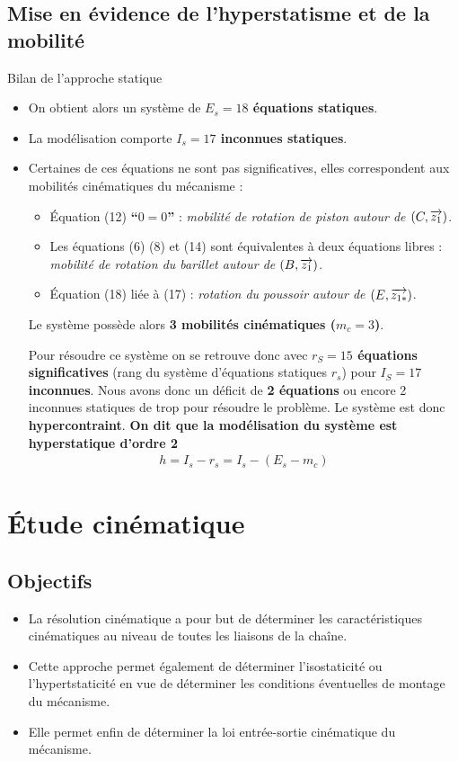 \documentclass[10pt,fleqn]{article} %
\begin{document}
\subsection{Mise en évidence de l'hyperstatisme et de la mobilité}
Bilan de l'approche statique
\begin{itemize}
\item On obtient alors un système de \textbf{$E_s=18$ équations statiques}.
\item La modélisation comporte \textbf{$I_s=17$ inconnues statiques}.
\item Certaines de ces équations ne sont pas significatives, elles correspondent aux mobilités cinématiques du mécanisme :
\begin{itemize}
\item Équation (12) \textbf{``$0=0$''} : \textit{mobilité de rotation de piston autour de $\left(C,\overrightarrow{{z_1}}\right)$}.
\item Les équations (6) (8) et (14) sont équivalentes à deux équations libres : \textit{mobilité de rotation du barillet autour de $\left(B,\overrightarrow{{z_1}}\right)$}.
\item Équation (18) liée à (17) : \textit{rotation du poussoir autour de $\left(E,\overrightarrow{{z_{1*}}}\right)$}.		
\end{itemize}
Le système possède alors \textbf{3 mobilités cinématiques ($m_c=3$)}.
		
		Pour résoudre ce système on se retrouve donc avec \textbf{$r_S=15$ équations significatives} (rang du système d'équations statiques $r_s$) pour \textbf{$I_S=17$ inconnues}. Nous avons donc un déficit de \textbf{2 équations} ou encore 2 inconnues statiques de trop pour résoudre le problème. Le système est donc \textbf{hypercontraint}.
		\textbf{On dit que la modélisation du système est hyperstatique d'ordre 2}
\begin{align}\label{hyper_statique}
\boxed{
h=I_s-r_s=I_s-(E_s-m_c)
}
\end{align}
		
\end{itemize}




\section{Étude cinématique}
\subsection{Objectifs}
\begin{itemize}
\item La résolution cinématique a pour but de déterminer les caractéristiques cinématiques au niveau de toutes les liaisons de la chaîne.
\item Cette approche permet également de déterminer l'isostaticité ou l'hypertstaticité en vue de déterminer les conditions éventuelles de montage du mécanisme.
\item Elle permet enfin de déterminer la loi entrée-sortie cinématique du mécanisme.
\end{itemize}
\end{document}
